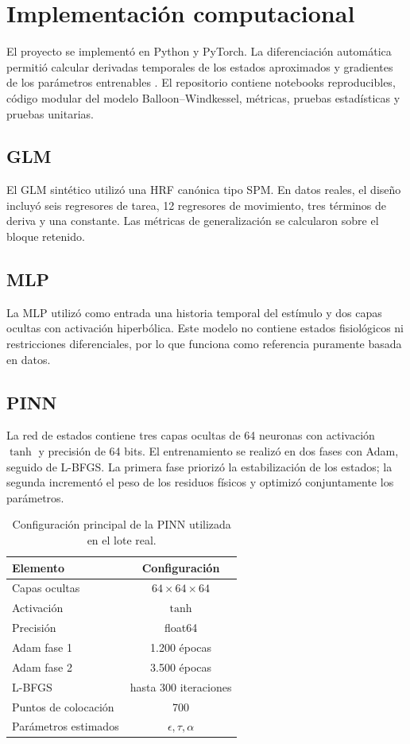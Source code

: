 \section{Implementación computacional}

El proyecto se implementó en Python y PyTorch. La diferenciación automática permitió calcular derivadas temporales de los estados aproximados y gradientes de los parámetros entrenables \citep{Paszke2019}. El repositorio contiene notebooks reproducibles, código modular del modelo Balloon--Windkessel, métricas, pruebas estadísticas y pruebas unitarias.

\subsection{GLM}

El GLM sintético utilizó una HRF canónica tipo SPM. En datos reales, el diseño incluyó seis regresores de tarea, 12 regresores de movimiento, tres términos de deriva y una constante. Las métricas de generalización se calcularon sobre el bloque retenido.

\subsection{MLP}

La MLP utilizó como entrada una historia temporal del estímulo y dos capas ocultas con activación hiperbólica. Este modelo no contiene estados fisiológicos ni restricciones diferenciales, por lo que funciona como referencia puramente basada en datos.

\subsection{PINN}

La red de estados contiene tres capas ocultas de 64 neuronas con activación $\tanh$ y precisión de 64 bits. El entrenamiento se realizó en dos fases con Adam, seguido de L-BFGS. La primera fase priorizó la estabilización de los estados; la segunda incrementó el peso de los residuos físicos y optimizó conjuntamente los parámetros.

\begin{table}[H]
\centering
\caption{Configuración principal de la PINN utilizada en el lote real.}
\label{tab:pinn_config}
\begin{tabular}{lc}
\toprule
Elemento & Configuración \\
\midrule
Capas ocultas & $64\times64\times64$ \\
Activación & $\tanh$ \\
Precisión & float64 \\
Adam fase 1 & 1.200 épocas \\
Adam fase 2 & 3.500 épocas \\
L-BFGS & hasta 300 iteraciones \\
Puntos de colocación & 700 \\
Parámetros estimados & $\epsilon,\tau,\alpha$ \\
\bottomrule
\end{tabular}
\end{table}

